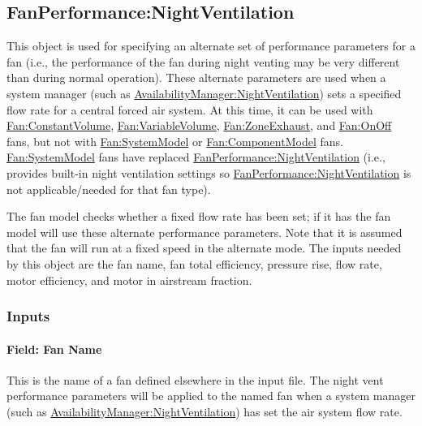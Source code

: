 \subsection{FanPerformance:NightVentilation}\label{fanperformancenightventilation}

This object is used for specifying an alternate set of performance parameters for a fan (i.e., the performance of the fan during night venting may be very different than during normal operation).
These alternate parameters are used when a system manager (such as \hyperref[availabilitymanagernightventilation]{AvailabilityManager:NightVentilation}) sets a specified flow rate for a central forced air system.
At this time, it can be used with \hyperref[fanconstantvolume]{Fan:ConstantVolume}, \hyperref[fanvariablevolume]{Fan:VariableVolume}, \hyperref[fanzoneexhaust]{Fan:ZoneExhaust}, and \hyperref[fanonoff]{Fan:OnOff} fans, but not with \hyperref[fansystemmodel]{Fan:SystemModel} or \hyperref[fancomponentmodel]{Fan:ComponentModel} fans.
\hyperref[fansystemmodel]{Fan:SystemModel} fans have replaced \hyperref[fanperformancenightventilation]{FanPerformance:NightVentilation} (i.e., provides built-in night ventilation settings so \hyperref[fanperformancenightventilation]{FanPerformance:NightVentilation} is not applicable/needed for that fan type).

The fan model checks whether a fixed flow rate has been set; if it has the fan model will use these alternate performance parameters. Note that it is assumed that the fan will run at a fixed speed in the alternate mode. The inputs needed by this object are the fan name, fan total efficiency, pressure rise, flow rate, motor efficiency, and motor in airstream fraction.

\subsubsection{Inputs}\label{inputs-4-013}

\paragraph{Field: Fan Name}\label{field-fan-name-001}

This is the name of a fan defined elsewhere in the input file. The night vent performance parameters will be applied to the named fan when a system manager (such as \hyperref[availabilitymanagernightventilation]{AvailabilityManager:NightVentilation}) has set the air system flow rate.

